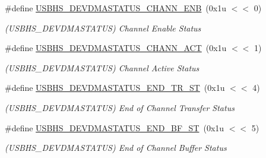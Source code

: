 \begin{DoxyCompactItemize}
\item 
\mbox{\label{group__SAMS70__USBHS_ga4102378a0925234238961d88caa949b1}} 
\#define \mbox{\hyperlink{group__SAMS70__USBHS_ga4102378a0925234238961d88caa949b1}{U\+S\+B\+H\+S\+\_\+\+D\+E\+V\+D\+M\+A\+S\+T\+A\+T\+U\+S\+\_\+\+C\+H\+A\+N\+N\+\_\+\+E\+NB}}~(0x1u $<$$<$ 0)
\begin{DoxyCompactList}\small\item\em (U\+S\+B\+H\+S\+\_\+\+D\+E\+V\+D\+M\+A\+S\+T\+A\+T\+US) Channel Enable Status \end{DoxyCompactList}\item 
\mbox{\label{group__SAMS70__USBHS_ga982a52b634020ac48449b7a15532abcc}} 
\#define \mbox{\hyperlink{group__SAMS70__USBHS_ga982a52b634020ac48449b7a15532abcc}{U\+S\+B\+H\+S\+\_\+\+D\+E\+V\+D\+M\+A\+S\+T\+A\+T\+U\+S\+\_\+\+C\+H\+A\+N\+N\+\_\+\+A\+CT}}~(0x1u $<$$<$ 1)
\begin{DoxyCompactList}\small\item\em (U\+S\+B\+H\+S\+\_\+\+D\+E\+V\+D\+M\+A\+S\+T\+A\+T\+US) Channel Active Status \end{DoxyCompactList}\item 
\mbox{\label{group__SAMS70__USBHS_ga425d05279c0c14944268728e346015b0}} 
\#define \mbox{\hyperlink{group__SAMS70__USBHS_ga425d05279c0c14944268728e346015b0}{U\+S\+B\+H\+S\+\_\+\+D\+E\+V\+D\+M\+A\+S\+T\+A\+T\+U\+S\+\_\+\+E\+N\+D\+\_\+\+T\+R\+\_\+\+ST}}~(0x1u $<$$<$ 4)
\begin{DoxyCompactList}\small\item\em (U\+S\+B\+H\+S\+\_\+\+D\+E\+V\+D\+M\+A\+S\+T\+A\+T\+US) End of Channel Transfer Status \end{DoxyCompactList}\item 
\mbox{\label{group__SAMS70__USBHS_ga132996c11225849c258ce9718acb6ac9}} 
\#define \mbox{\hyperlink{group__SAMS70__USBHS_ga132996c11225849c258ce9718acb6ac9}{U\+S\+B\+H\+S\+\_\+\+D\+E\+V\+D\+M\+A\+S\+T\+A\+T\+U\+S\+\_\+\+E\+N\+D\+\_\+\+B\+F\+\_\+\+ST}}~(0x1u $<$$<$ 5)
\begin{DoxyCompactList}\small\item\em (U\+S\+B\+H\+S\+\_\+\+D\+E\+V\+D\+M\+A\+S\+T\+A\+T\+US) End of Channel Buffer Status \end{DoxyCompactList}\item 

\end{DoxyCompactItemize}
